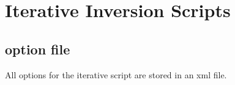 \section{Iterative Inversion Scripts}

\subsection{option file}
All options for the iterative script are stored in an xml file.



